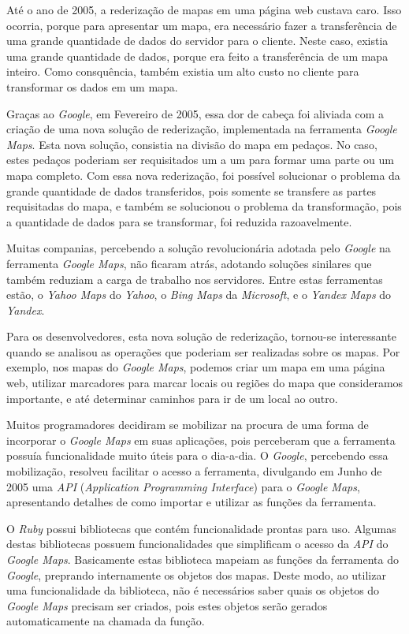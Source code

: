 Até o ano de 2005, a rederização de mapas em uma página web custava caro. Isso ocorria,
porque para apresentar um mapa, era necessário fazer a transferência de uma grande
quantidade de dados do servidor para o cliente. Neste caso, existia uma grande quantidade
de dados, porque era feito a transferência de um mapa inteiro. Como consquência, também
existia um alto custo no cliente para transformar os dados em um mapa.

Graças ao \emph{Google}, em Fevereiro de 2005, essa dor de cabeça foi aliviada com a criação
de uma nova solução de rederização, implementada na ferramenta \emph{Google Maps}. Esta nova
solução, consistia na divisão do mapa em pedaços. No caso, estes pedaços poderiam ser
requisitados um a um para formar uma parte ou um mapa completo. Com essa nova rederização,
foi possível solucionar o problema da grande quantidade de dados transferidos, pois somente
se transfere as partes requisitadas do mapa, e também se solucionou o problema da transformação,
pois a quantidade de dados para se transformar, foi reduzida razoavelmente.

Muitas companias, percebendo a solução revolucionária adotada pelo \emph{Google} na
ferramenta \emph{Google Maps}, não ficaram atrás, adotando soluções sinilares que
também reduziam a carga de trabalho nos servidores. Entre estas ferramentas estão, o
\emph{Yahoo Maps} do \emph{Yahoo}, o \emph{Bing Maps} da \emph{Microsoft}, e o
\emph{Yandex Maps} do \emph{Yandex}.

Para os desenvolvedores, esta nova solução de rederização, tornou-se interessante
quando se analisou as operações que poderiam ser realizadas sobre os mapas. Por exemplo, nos
mapas do \emph{Google Maps}, podemos criar um mapa em uma página web, utilizar marcadores para
marcar locais ou regiões do mapa que consideramos importante, e até determinar caminhos
para ir de um local ao outro.

Muitos programadores decidiram se mobilizar na procura de uma forma de incorporar o
\emph{Google Maps} em suas aplicações, pois perceberam que a ferramenta possuía funcionalidade
muito úteis para o dia-a-dia. O \emph{Google}, percebendo essa mobilização, resolveu facilitar
o acesso a ferramenta, divulgando em Junho de 2005 uma \emph{API}
(\emph{Application Programming Interface}) para o \emph{Google Maps}, apresentando
detalhes de como importar e utilizar as funções da ferramenta.

O \emph{Ruby} possui bibliotecas que contém funcionalidade prontas para uso. Algumas destas
bibliotecas possuem funcionalidades que simplificam o acesso da \emph{API} do \emph{Google Maps}.
Basicamente estas biblioteca mapeiam as funções da ferramenta do \emph{Google}, preprando
internamente os objetos dos mapas. Deste modo, ao utilizar uma funcionalidade da biblioteca, não
é necessários saber quais os objetos do \emph{Google Maps} precisam ser criados, pois estes
objetos serão gerados automaticamente na chamada da função.

